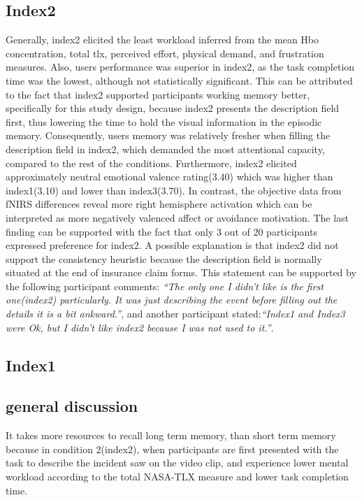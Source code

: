 \documentclass[a4paper]{report}
\begin{document}
		\subsection{Index2}
		Generally, index2 elicited the least workload inferred from the mean Hbo concentration, total tlx, perceived effort, physical demand, and frustration measures. Also, users performance was superior in index2, as the task completion time was the lowest, although not statistically significant. This can be attributed to the fact that index2 supported participants working memory better, specifically for this study design, because index2 presents the description field first, thus lowering the time to hold the visual information in the episodic memory. Consequently, users memory was relatively fresher when filling the description field in index2, which demanded the most attentional capacity, compared to the rest of the conditions. Furthermore, index2 elicited approximately neutral emotional valence rating(3.40) which was higher than index1(3.10) and lower than index3(3.70). In contrast, the objective data from fNIRS differences reveal more right hemisphere activation which can be interpreted as more negatively valenced affect or avoidance motivation. The last finding can be supported with the fact that only 3 out of 20 participants expressed preference for index2. A possible explanation is that index2 did not support the consistency heuristic\cite{nielsen1990heuristic,shneiderman1992designing} because the description field is normally situated at the end of insurance claim forms. This statement can be supported by the following participant comments: \textit{``The only one I didn't like is the first one(index2) particularly. It was just describing the event before filling out the details it is a bit ankward.''}, and another participant stated:\textit{``Index1 and Index3 were Ok, but I didn't like index2 because I was not used to it.''}.
				
		\subsection{Index1}
		
	
	
		
		\subsection{general discussion}
		It takes more resources to recall long term memory, than short term memory because in condition 2(index2), when participants are first presented with the task to describe the incident saw on the video clip, and experience lower mental workload according to the total NASA-TLX measure and lower task completion time.
		
\end{document}
